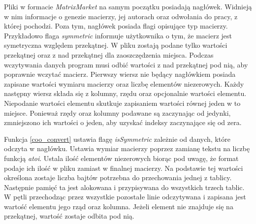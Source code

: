 Pliki w formacie \textit{MatrixMarket} na samym początku posiadają nagłówek.
Widnieją w nim informacje o genezie macierzy, jej autorach oraz odwołania do pracy, z której pochodzi.
Poza tym, nagłówek posiada flagi opisujące typ macierzy.
Przykładowo flaga \textit{symmetric} informuje użytkownika o tym, że macierz jest symetryczna względem przekątnej.
W pliku zostają podane tylko wartości przekątnej oraz z nad przekątnej dla zaoszczędzenia miejsca.
Podczas wczytywania danych program musi odbić wartości z nad przekątnej pod nią, aby poprawnie wczytać macierz. 
Pierwszy wiersz nie będący nagłówkiem posiada zapisane wartości wymiaru macierzy oraz liczbę elementów niezerowych.
Każdy następny wiersz składa się z kolumny, rzędu oraz opcjonalnie wartości elementu.
Niepodanie wartości elementu skutkuje zapisaniem wartości równej jeden w to miejsce.
Ponieważ rzędy oraz kolumny podawane są zaczynając od jedynki, zmniejszono ich wartości o jeden, aby uzyskać indeksy zaczynające się od zera.

Funkcja \ref{coo_convert} ustawia flagę \textit{isSymmetric} zależnie od danych, które odczyta w nagłówku.
Ustawia wymiar macierzy poprzez zamianę tekstu na liczbę funkcją \textit{atoi}.
Ustala ilość elementów niezerowych biorąc pod uwagę, że format podaje ich ilość w pliku zamiast w finalnej macierzy.
Na podstawie tej wartości określona zostaje liczba bajtów potrzebna do przechowania jednej z tablicy.
Następnie pamięć ta jest alokowana i przypisywana do wszystkich trzech tablic.
W pętli przechodząc przez wszystkie pozostałe linie odczytywana i zapisana jest wartość elementu jego rząd oraz kolumna.
Jeżeli element nie znajduje się na przekątnej, wartość zostaje odbita pod nią.


